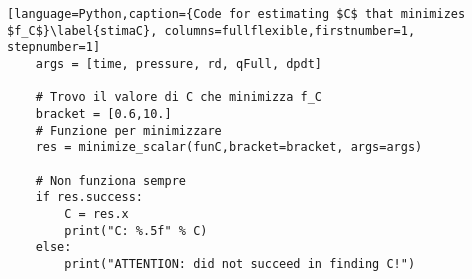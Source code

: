 \begin{lstlisting}[language=Python,caption={Code for estimating $C$ that minimizes $f_C$}\label{stimaC}, columns=fullflexible,firstnumber=1, stepnumber=1]
    args = [time, pressure, rd, qFull, dpdt]
    
    # Trovo il valore di C che minimizza f_C
    bracket = [0.6,10.]
    # Funzione per minimizzare
    res = minimize_scalar(funC,bracket=bracket, args=args)
    
    # Non funziona sempre
    if res.success:
        C = res.x
        print("C: %.5f" % C)
    else:
        print("ATTENTION: did not succeed in finding C!")
\end{lstlisting}